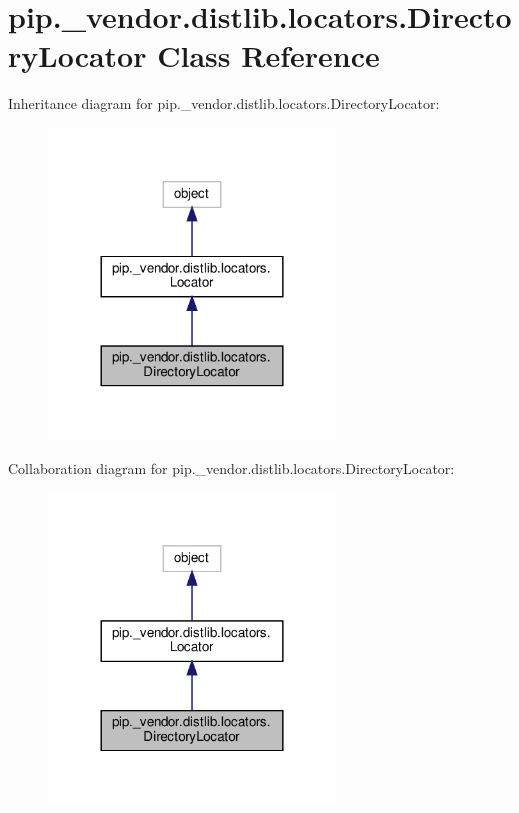 \hypertarget{classpip_1_1__vendor_1_1distlib_1_1locators_1_1DirectoryLocator}{}\section{pip.\+\_\+vendor.\+distlib.\+locators.\+Directory\+Locator Class Reference}
\label{classpip_1_1__vendor_1_1distlib_1_1locators_1_1DirectoryLocator}


Inheritance diagram for pip.\+\_\+vendor.\+distlib.\+locators.\+Directory\+Locator\+:
\nopagebreak
\begin{figure}[H]
\begin{center}
\leavevmode
\includegraphics[width=216pt]{classpip_1_1__vendor_1_1distlib_1_1locators_1_1DirectoryLocator__inherit__graph}
\end{center}
\end{figure}


Collaboration diagram for pip.\+\_\+vendor.\+distlib.\+locators.\+Directory\+Locator\+:
\nopagebreak
\begin{figure}[H]
\begin{center}
\leavevmode
\includegraphics[width=216pt]{classpip_1_1__vendor_1_1distlib_1_1locators_1_1DirectoryLocator__coll__graph}
\end{center}
\end{figure}
